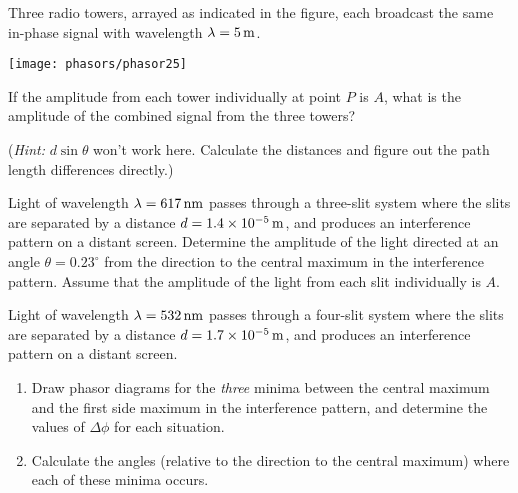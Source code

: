 \newpage

\begin{problem}
Three radio towers, arrayed as indicated in the figure, each broadcast
the same in-phase signal with wavelength $\lambda = 5\,\mbox{m}$.

 \texttt{[image: phasors/phasor25]} 

\noindent If the amplitude from each tower individually at point $P$
is $A$, what is the amplitude of the combined signal from the three
towers?

\noindent ({\em Hint:} $d\sin{\theta}$ won't work here. Calculate 
the distances and figure out the path length differences directly.)
\label{prob:three_towers}
\end{problem}

\begin{problem}
Light of wavelength $\lambda = 617\,\mbox{nm}$ passes
through a three-slit system where the slits are separated by a
distance $d = 1.4 \times 10^{-5}\,\mbox{m}$, and produces an
interference pattern on a distant screen. Determine the amplitude of the 
light directed at an angle $\theta = 0.23^\circ$ from the direction to 
the central maximum in the interference pattern. Assume that the amplitude 
of the light from each slit individually is $A$.
\end{problem}

\begin{problem}
Light of wavelength $\lambda = 532\,\mbox{nm}$ passes
through a four-slit system where the slits are separated by a
distance $d = 1.7 \times 10^{-5}\,\mbox{m}$, and produces an
interference pattern on a distant screen.
\begin{enumerate}
\item  Draw phasor diagrams for the {\em three} minima between the central
maximum and the first side maximum in the interference pattern, and
determine the values of $\Delta\phi$ for each situation.
\item Calculate the angles (relative to the direction to the central
maximum) where each of these minima occurs.
\end{enumerate}
\label{prob:four_slits}
\end{problem}

